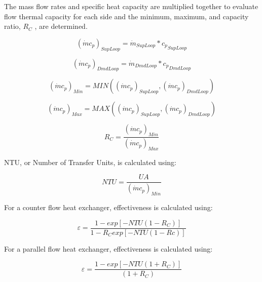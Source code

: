 The mass flow rates and specific heat capacity are multiplied together to evaluate flow thermal capacity for each side and the minimum, maximum, and capacity ratio, \({R_C}\) , are determined.

\begin{equation}
{\left( {\dot m{c_p}} \right)_{SupLoop}} = {\dot m_{SupLoop}}*{c_p}_{SupLoop}
\end{equation}

\begin{equation}
{\left( {\dot m{c_p}} \right)_{DmdLoop}} = {\dot m_{DmdLoop}}*{c_p}_{DmdLoop}
\end{equation}

\begin{equation}
{\left( {\dot m{c_p}} \right)_{Min}} = MIN\left( {{{\left( {\dot m{c_p}} \right)}_{SupLoop}},{{\left( {\dot m{c_p}} \right)}_{DmdLoop}}} \right)
\end{equation}

\begin{equation}
{\left( {\dot m{c_p}} \right)_{Max}} = MAX\left( {{{\left( {\dot m{c_p}} \right)}_{SupLoop}},{{\left( {\dot m{c_p}} \right)}_{DmdLoop}}} \right)
\end{equation}

\begin{equation}
{R_C} = \frac{{{{\left( {\dot m{c_p}} \right)}_{Min}}}}{{{{\left( {\dot m{c_p}} \right)}_{Max}}}}
\end{equation}

NTU, or Number of Transfer Units, is calculated using:

\begin{equation}
NTU = \frac{{UA}}{{{{\left( {\dot m{c_p}} \right)}_{Min}}}}
\end{equation}

For a counter flow heat exchanger, effectiveness is calculated using:

\begin{equation}
\varepsilon  = \frac{{1 - exp\left[ { - NTU\left( {1 - {R_C}} \right)} \right]}}{{1 - {R_C}exp\left[ { - NTU\left( {1 - Rc} \right)} \right]}}
\end{equation}

For a parallel flow heat exchanger, effectiveness is calculated using:

\begin{equation}
\varepsilon  = \frac{{1 - exp\left[ { - NTU\left( {1 + {R_C}} \right)} \right]}}{{\left( {1 + {R_C}} \right)}}
\end{equation}

